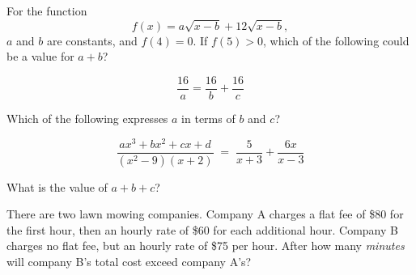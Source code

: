 \noindent\markforreview
\vspace{1em}

\vspace{1em}

For the function
\[
f(x) = a\sqrt{x-b} + 12\sqrt{x-b},
\]
$a$ and $b$ are constants, and $f(4)=0$. If $f(5) > 0$, which of the following could be a value for $a+b$?

\vspace{0.75em}


\vspace{2em}

\vspace{2em}

\noindent\markforreview
\vspace{1em}

\vspace{1em}

\[
\frac{16}{a}=\frac{16}{b}+\frac{16}{c}
\]

Which of the following expresses $a$ in terms of $b$ and $c$?

\vspace{0.75em}


\newpage


\vspace{2em}

\newpage

\noindent\markforreview
\vspace{1em}

\vspace{1em}

\[
\frac{ax^{3}+bx^{2}+cx+d}{(x^{2}-9)(x+2)}
\;=\;
\frac{5}{x+3}+\frac{6x}{x-3}
\]

What is the value of $a+b+c$?

\vspace{1.5em}

\vspace{2em}

\noindent\markforreview
\vspace{1em}

\vspace{1em}

There are two lawn mowing companies. Company A charges a flat fee of \$80 for the first hour, then an hourly rate of \$60 for each additional hour.  
Company B charges no flat fee, but an hourly rate of \$75 per hour.  
After how many \textit{minutes} will company B's total cost exceed company A's?

